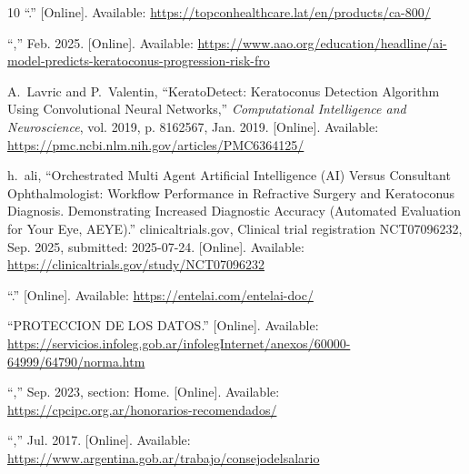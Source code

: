 \begin{thebibliography}{10}
\BIBentryALTinterwordspacing
``.'' [Online]. Available:
  \url{https://topconhealthcare.lat/en/products/ca-800/}
\BIBentrySTDinterwordspacing

\BIBentryALTinterwordspacing
``,'' Feb. 2025. [Online]. Available:
  \url{https://www.aao.org/education/headline/ai-model-predicts-keratoconus-progression-risk-fro}
\BIBentrySTDinterwordspacing

\BIBentryALTinterwordspacing
A.~Lavric and P.~Valentin, ``{KeratoDetect}: {Keratoconus} {Detection}
  {Algorithm} {Using} {Convolutional} {Neural} {Networks},''
  \emph{Computational Intelligence and Neuroscience}, vol. 2019, p. 8162567,
  Jan. 2019. [Online]. Available:
  \url{https://pmc.ncbi.nlm.nih.gov/articles/PMC6364125/}
\BIBentrySTDinterwordspacing

\BIBentryALTinterwordspacing
h.~ali, ``Orchestrated {Multi} {Agent} {Artificial} {Intelligence} ({AI})
  {Versus} {Consultant} {Ophthalmologist}: {Workflow} {Performance} in
  {Refractive} {Surgery} and {Keratoconus} {Diagnosis}. {Demonstrating}
  {Increased} {Diagnostic} {Accuracy} ({Automated} {Evaluation} for {Your}
  {Eye}, {AEYE}).'' clinicaltrials.gov, Clinical trial registration
  NCT07096232, Sep. 2025, submitted: 2025-07-24. [Online]. Available:
  \url{https://clinicaltrials.gov/study/NCT07096232}
\BIBentrySTDinterwordspacing

\BIBentryALTinterwordspacing
``.'' [Online]. Available:
  \url{https://entelai.com/entelai-doc/}
\BIBentrySTDinterwordspacing

\BIBentryALTinterwordspacing
``{PROTECCION} {DE} {LOS} {DATOS}.'' [Online]. Available:
  \url{https://servicios.infoleg.gob.ar/infolegInternet/anexos/60000-64999/64790/norma.htm}
\BIBentrySTDinterwordspacing

\BIBentryALTinterwordspacing
``,'' Sep. 2023, section:
  Home. [Online]. Available:
  \url{https://cpcipc.org.ar/honorarios-recomendados/}
\BIBentrySTDinterwordspacing

\BIBentryALTinterwordspacing
``,'' Jul. 2017. [Online].
  Available: \url{https://www.argentina.gob.ar/trabajo/consejodelsalario}
\BIBentrySTDinterwordspacing


\end{thebibliography}
